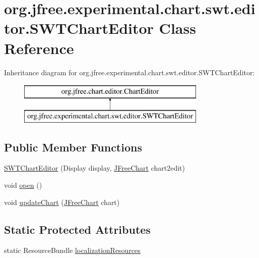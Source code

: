 \hypertarget{classorg_1_1jfree_1_1experimental_1_1chart_1_1swt_1_1editor_1_1_s_w_t_chart_editor}{}\section{org.\+jfree.\+experimental.\+chart.\+swt.\+editor.\+S\+W\+T\+Chart\+Editor Class Reference}
\label{classorg_1_1jfree_1_1experimental_1_1chart_1_1swt_1_1editor_1_1_s_w_t_chart_editor}
Inheritance diagram for org.\+jfree.\+experimental.\+chart.\+swt.\+editor.\+S\+W\+T\+Chart\+Editor\+:\begin{figure}[H]
\begin{center}
\leavevmode
\includegraphics[height=2.000000cm]{classorg_1_1jfree_1_1experimental_1_1chart_1_1swt_1_1editor_1_1_s_w_t_chart_editor}
\end{center}
\end{figure}
\subsection*{Public Member Functions}
\begin{DoxyCompactItemize}
\item 
\mbox{\hyperlink{classorg_1_1jfree_1_1experimental_1_1chart_1_1swt_1_1editor_1_1_s_w_t_chart_editor_ac328e097d7d6c800b6265a4f071566dc}{S\+W\+T\+Chart\+Editor}} (Display display, \mbox{\hyperlink{classorg_1_1jfree_1_1chart_1_1_j_free_chart}{J\+Free\+Chart}} chart2edit)
\item 
void \mbox{\hyperlink{classorg_1_1jfree_1_1experimental_1_1chart_1_1swt_1_1editor_1_1_s_w_t_chart_editor_a762915085d58523d22c4f07260133386}{open}} ()
\item 
void \mbox{\hyperlink{classorg_1_1jfree_1_1experimental_1_1chart_1_1swt_1_1editor_1_1_s_w_t_chart_editor_a5efd014f93a0bfbe30f4f5110a2844b8}{update\+Chart}} (\mbox{\hyperlink{classorg_1_1jfree_1_1chart_1_1_j_free_chart}{J\+Free\+Chart}} chart)
\end{DoxyCompactItemize}
\subsection*{Static Protected Attributes}
\begin{DoxyCompactItemize}
\item 
static Resource\+Bundle \mbox{\hyperlink{classorg_1_1jfree_1_1experimental_1_1chart_1_1swt_1_1editor_1_1_s_w_t_chart_editor_aef23e03266bc3922fe406c2af1689dde}{localization\+Resources}}
\end{DoxyCompactItemize}


